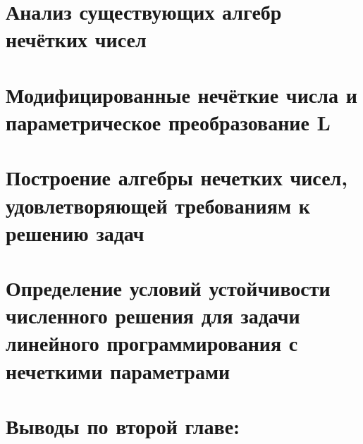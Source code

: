 \newpage
\section{Анализ существующих алгебр нечётких чисел}
\label{chapter2_1}


\section{Модифицированные нечёткие числа и параметрическое преобразование L}
\label{chapter2_2}


\section{Построение алгебры нечетких чисел, удовлетворяющей требованиям к решению задач} 
\label{chapter2_3}


\section{Определение условий устойчивости численного решения для задачи линейного программирования с нечеткими параметрами} 
\label{chapter2_4}


\newpage
\section*{Выводы по второй главе:} 
\label{chapter2_5}

